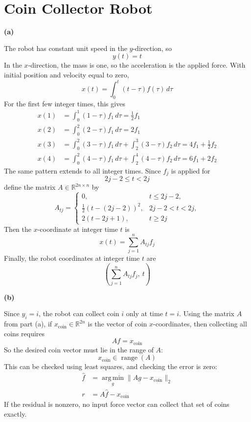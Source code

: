 \section{Coin Collector Robot}

\textbf{(a)}

The robot has constant unit speed in the \(y\)-direction, so
\[
    y(t)=t
\]
In the \(x\)-direction, the mass is one, so the acceleration is the
applied force. With initial position and velocity equal to zero,
\[
    x(t)=\int_0^t (t-\tau)f(\tau)\,d\tau
\]
For the first few integer times, this gives
\[
\begin{aligned}
    x(1)
        &=\int_0^1 (1-\tau)f_1\,d\tau
          =\frac{1}{2}f_1\\
    x(2)
        &=\int_0^2 (2-\tau)f_1\,d\tau
          =2f_1\\
    x(3)
        &=\int_0^2 (3-\tau)f_1\,d\tau
          +\int_2^3 (3-\tau)f_2\,d\tau
          =4f_1+\frac{1}{2}f_2\\
    x(4)
        &=\int_0^2 (4-\tau)f_1\,d\tau
          +\int_2^4 (4-\tau)f_2\,d\tau
          =6f_1+2f_2
\end{aligned}
\]
The same pattern extends to all integer times. Since \(f_j\) is applied for
\[
    2j-2\leq t<2j
\]
define the matrix \(A\in\mathbb{R}^{2n\times n}\) by
\[
    A_{tj}=
    \begin{cases}
        0, & t\leq 2j-2,\\[3pt]
        \frac{1}{2}(t-(2j-2))^2, & 2j-2<t<2j,\\[3pt]
        2(t-2j+1), & t\geq 2j
    \end{cases}
\]
Then the \(x\)-coordinate at integer time \(t\) is
\[
    x(t)=\sum_{j=1}^n A_{tj}f_j
\]
Finally, the robot coordinates at integer time \(t\) are
\[
    \left(\sum_{j=1}^n A_{tj}f_j,\ t\right)
\]

\textbf{(b)}

Since \(y_i=i\), the robot can collect coin \(i\) only at time \(t=i\).
Using the matrix \(A\) from part (a), if
\(x_{\mathrm{coin}}\in\mathbb{R}^{2n}\) is the vector of coin
\(x\)-coordinates, then collecting all coins requires
\[
    Af=x_{\mathrm{coin}}
\]
So the desired coin vector must lie in the range of \(A\):
\[
    x_{\mathrm{coin}}\in\operatorname{range}(A)
\]
This can be checked using least squares, and checking the error is zero:
\[
\begin{aligned}
    \hat f&=\operatorname*{arg\,min}_g\|Ag-x_{\mathrm{coin}}\|_2\\
    r&=A\hat f-x_{\mathrm{coin}}
\end{aligned}
\]
If the residual is nonzero, no input force vector can collect that set of coins exactly.

